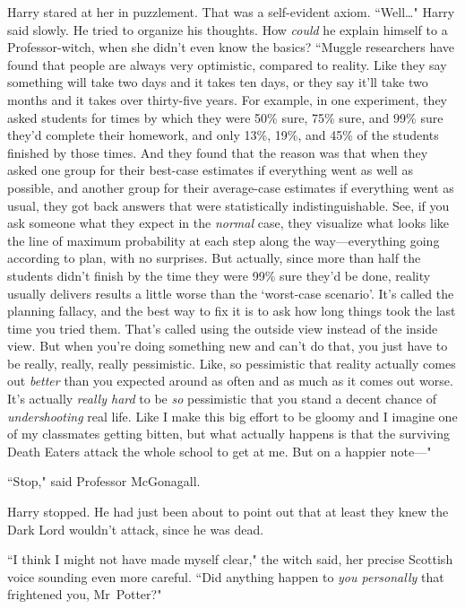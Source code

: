 Harry stared at her in puzzlement. That was a self-evident axiom. ``Well{\ldots}" Harry said slowly. He tried to organize his thoughts. How \emph{could} he explain himself to a Professor-witch, when she didn't even know the basics? ``Muggle researchers have found that people are always very optimistic, compared to reality. Like they say something will take two days and it takes ten days, or they say it'll take two months and it takes over thirty-five years. For example, in one experiment, they asked students for times by which they were 50\% sure, 75\% sure, and 99\% sure they'd complete their homework, and only 13\%, 19\%, and 45\% of the students finished by those times. And they found that the reason was that when they asked one group for their best-case estimates if everything went as well as possible, and another group for their average-case estimates if everything went as usual, they got back answers that were statistically indistinguishable. See, if you ask someone what they expect in the \emph{normal} case, they visualize what looks like the line of maximum probability at each step along the way—everything going according to plan, with no surprises. But actually, since more than half the students didn't finish by the time they were 99\% sure they'd be done, reality usually delivers results a little worse than the `worst-case scenario'. It's called the planning fallacy, and the best way to fix it is to ask how long things took the last time you tried them. That's called using the outside view instead of the inside view. But when you're doing something new and can't do that, you just have to be really, really, really pessimistic. Like, so pessimistic that reality actually comes out \emph{better} than you expected around as often and as much as it comes out worse. It's actually \emph{really hard} to be \emph{so} pessimistic that you stand a decent chance of \emph{undershooting} real life. Like I make this big effort to be gloomy and I imagine one of my classmates getting bitten, but what actually happens is that the surviving Death Eaters attack the whole school to get at me. But on a happier note—"

``Stop," said Professor McGonagall.

Harry stopped. He had just been about to point out that at least they knew the Dark Lord wouldn't attack, since he was dead.

``I think I might not have made myself clear," the witch said, her precise Scottish voice sounding even more careful. ``Did anything happen to \emph{you personally} that frightened you, Mr~Potter?"

